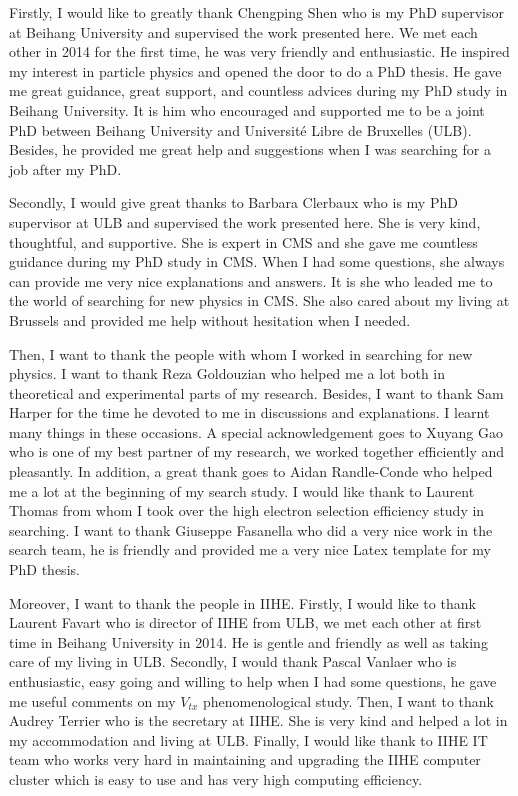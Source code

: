 Firstly, I would like to greatly thank Chengping Shen who is my PhD supervisor at Beihang University and supervised the work presented here. We met each other in 2014 for the first time, he was very friendly and enthusiastic. He inspired my interest in particle physics and opened the door to do a PhD thesis. He gave me great guidance, great support, and countless advices during my PhD study in Beihang University. It is him who encouraged and supported me to be a joint PhD between Beihang University and Universit\'e Libre de Bruxelles (ULB). Besides, he provided me great help and suggestions when I was searching for a job after my PhD.

Secondly, I would give great thanks to Barbara Clerbaux who is my PhD supervisor at ULB and supervised the work presented here. She is very kind, thoughtful, and supportive. She is expert in CMS and she gave me countless guidance during my PhD study in CMS. When I had some questions, she always can provide me very nice explanations and answers. It is she who leaded me to the world of searching for new physics in CMS. She also cared about my living at Brussels and provided me help without hesitation when I needed.

Then, I want to thank the people with whom I worked in searching for new physics. I want to thank Reza Goldouzian who helped me a lot both in theoretical and experimental parts of my research. Besides, I want to thank Sam Harper for the time he devoted to me in discussions and explanations. I learnt many things in these occasions. A special acknowledgement goes to Xuyang Gao who is one of my best partner of my research, we worked together efficiently and pleasantly. In addition, a great thank goes to Aidan Randle-Conde who helped me a lot at the beginning of my \ZP search study. I would like thank to Laurent Thomas from whom I took over the high \PT electron selection efficiency study in \ZP searching. I want to thank Giuseppe Fasanella who did a very nice work in the \ZP search team, he is friendly and provided me a very nice Latex template for my PhD thesis.

Moreover, I want to thank the people in IIHE. Firstly, I would like to thank Laurent Favart who is director of IIHE from ULB, we met each other at first time in Beihang University in 2014. He is gentle and friendly as well as taking care of my living in ULB. Secondly, I would thank Pascal Vanlaer who is enthusiastic, easy going and willing to help when I had some questions, he gave me useful comments on my $V_{tx}$ phenomenological study.
Then, I want to thank Audrey Terrier who is the secretary at IIHE. She is very kind and helped a lot in my accommodation and living at ULB. Finally, I would like thank to IIHE IT team who works very hard in maintaining and upgrading the IIHE computer cluster which is easy to use and has very high computing efficiency.

